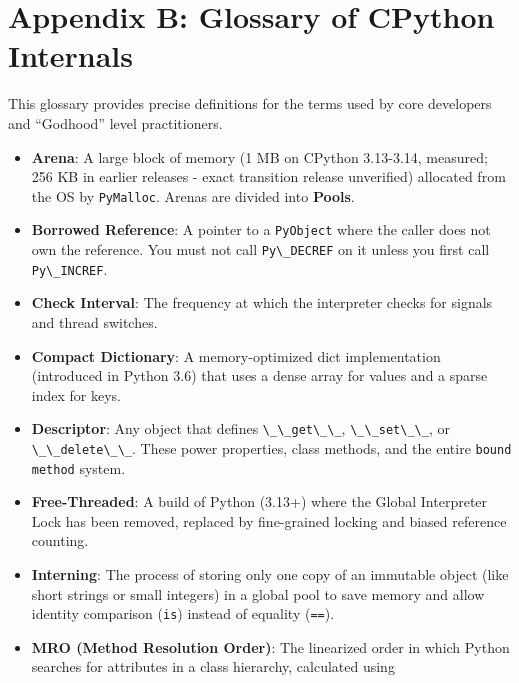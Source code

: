 \hypertarget{appendix-b-glossary-of-cpython-internals}{%
\chapter{Appendix B: Glossary of CPython
Internals}\label{appendix-b-glossary-of-cpython-internals}}

This glossary provides precise definitions for the terms used by core
developers and ``Godhood'' level practitioners.

\begin{itemize}
\tightlist
\item
  \textbf{Arena}: A large block of memory (1 MB on CPython 3.13-3.14, measured; 256 KB in earlier releases - exact transition release unverified) allocated
  from the OS by \passthrough{\lstinline!PyMalloc!}. Arenas are divided
  into \textbf{Pools}.\item
  \textbf{Borrowed Reference}: A pointer to a
  \passthrough{\lstinline!PyObject!} where the caller does not own the
  reference. You must not call \passthrough{\lstinline!Py\_DECREF!} on
  it unless you first call \passthrough{\lstinline!Py\_INCREF!}.
\item
  \textbf{Check Interval}: The frequency at which the interpreter checks
  for signals and thread switches.
\item
  \textbf{Compact Dictionary}: A memory-optimized dict implementation
  (introduced in Python 3.6) that uses a dense array for values and a
  sparse index for keys.
\item
  \textbf{Descriptor}: Any object that defines
  \passthrough{\lstinline!\_\_get\_\_!},
  \passthrough{\lstinline!\_\_set\_\_!}, or
  \passthrough{\lstinline!\_\_delete\_\_!}. These power properties,
  class methods, and the entire \passthrough{\lstinline!bound method!}
  system.
\item
  \textbf{Free-Threaded}: A build of Python (3.13+) where the Global
  Interpreter Lock has been removed, replaced by fine-grained locking
  and biased reference counting.
\item
  \textbf{Interning}: The process of storing only one copy of an
  immutable object (like short strings or small integers) in a global
  pool to save memory and allow identity comparison
  (\passthrough{\lstinline!is!}) instead of equality
  (\passthrough{\lstinline!==!}).
\item
  \textbf{MRO (Method Resolution Order)}: The linearized order in which
  Python searches for attributes in a class hierarchy, calculated using

\end{itemize}
